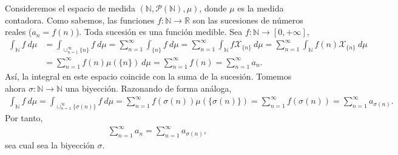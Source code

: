 \begin{ejemplo}
Consideremos el espacio de medida $(\mathbb{N},\mathcal{P}(\mathbb{N}),\mu)$, donde $\mu$ es la medida contadora. Como sabemos, las funciones $f: \mathbb{N} \longrightarrow \mathbb{R}$ son las sucesiones de números reales ($a_n = f(n)$). Toda sucesión es una función medible. Sea $f : \mathbb{N} \longrightarrow [0,+\infty]$,
\begin{align*}
    \int_{\mathbb{N}}{f \ d\mu} &= \int_{\cup_{n=1}^{\infty}{\{n\}}}{f \ d\mu} = \sum_{n=1}^{\infty}{\int_{\{n\}}{f \ d\mu}} = \sum_{n=1}^{\infty}{\int_{\mathbb{N}}{f\mathcal{X}_{\{n\}}} \ d\mu} = \sum_{n=1}^{\infty}{\int_{\mathbb{N}}{f(n)\mathcal{X}_{\{n\}} \ d\mu}}\\
    &= \sum_{n=1}^{\infty}{f(n)\mu(\{n\}) \ d\mu} = \sum_{n=1}^{\infty}{f(n)} = \sum_{n=1}^{\infty}{a_n}.
\end{align*}
Así, la integral en este espacio coincide con la suma de la sucesión. Tomemos  ahora $\sigma: \mathbb{N} \longrightarrow \mathbb{N}$ una biyección. Razonando de forma análoga,
\begin{align*}
   \int_{\mathbb{N}}{f \ d\mu} = \int_{\cup_{n=1}^{\infty}{\{\sigma(n)\}}}{f \ d\mu} = \sum_{n=1}^{\infty}{f(\sigma(n))\mu(\{\sigma(n)\})} = \sum_{n=1}^{\infty}{f(\sigma(n))} = \sum_{n=1}^{\infty}{a_{\sigma(n)}}.
\end{align*}
Por tanto,
\begin{align*}
    \sum_{n=1}^{\infty}{a_n} = \sum_{n=1}^{\infty}{a_{\sigma(n)}},
\end{align*}
sea cual sea la biyección $\sigma$. 
\end{ejemplo}

